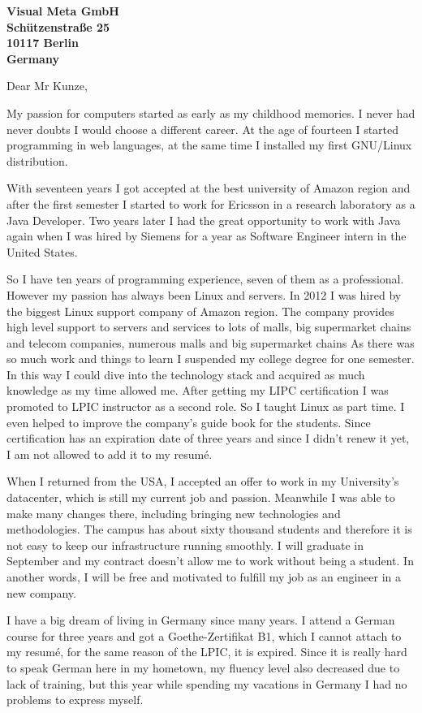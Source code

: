 \documentclass[a4paper]{willianpaixao-resume}
\begin{document}
\begin{letter}{\bfseries Visual Meta GmbH\\Schützenstraße 25\\10117 Berlin\\Germany}
\opening{Dear Mr Kunze,}

My passion for computers started as early as my childhood memories. I never had
never doubts I would choose a different career. At the age of fourteen I started
programming in web languages, at the same time I installed my first GNU/Linux
distribution.

With seventeen years I got accepted at the best university of Amazon region and
after the first semester I started to work for Ericsson in a research laboratory
as a Java Developer. Two years later I had the great opportunity to work with
Java again when I was hired by Siemens for a year as Software Engineer intern in
the United States.

So I have ten years of programming experience, seven of them as a professional.
However my passion has always been Linux and servers. In 2012 I was hired by the
biggest Linux support company of Amazon region. The company provides high level
support to servers and services to lots of malls, big supermarket chains and
telecom companies, numerous malls and big supermarket chains As there was so
much work and things to learn I suspended my college degree for one semester. In
this way I could dive into the technology stack and acquired as much knowledge
as my time allowed me. After getting my LIPC certification I was promoted to
LPIC instructor as a second role. So I taught Linux as part time. I even helped
to improve the company's guide book for the students. Since certification has an
expiration date of three years and since I didn't renew it yet, I am not allowed
to add it to my resumé.

When I returned from the USA, I accepted an offer to work in my University's
datacenter, which is still my current job and passion. Meanwhile I was able to
make many changes there, including bringing new technologies and methodologies.
The campus has about sixty thousand students and therefore it is not easy to
keep our infrastructure running smoothly. I will graduate in September and my
contract doesn't allow me to work without being a student. In another words, I
will be free and motivated to fulfill my job as an engineer in a new company.

I have a big dream of living in Germany since many years. I attend a German
course for three years and got a Goethe-Zertifikat B1, which I cannot attach to
my resumé, for the same reason of the LPIC, it is expired. Since it is really
hard to speak German here in my hometown, my fluency level also decreased due to
lack of training, but this year while spending my vacations in Germany I had no
problems to express myself.


\end{letter}
\end{document}
